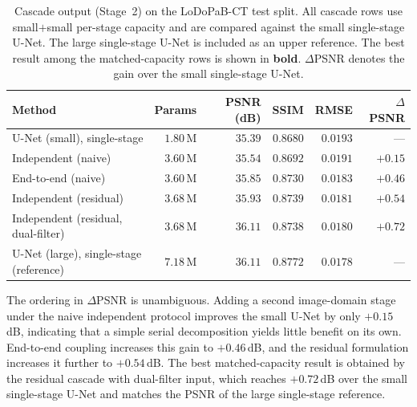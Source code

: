 \begin{table}[!htb]
    \centering
    \caption[Cascade comparison at matched per-stage capacity.]{%
        Cascade output (Stage~2) on the LoDoPaB-CT test split. All cascade
        rows use small$+$small per-stage capacity and are compared against
        the small single-stage U-Net. The large single-stage U-Net is
        included as an upper reference. The best result among the
        matched-capacity rows is shown in \textbf{bold}. $\Delta$PSNR denotes
        the gain over the small single-stage U-Net.}
    \label{tab:exp_cascade}
    \setlength{\tabcolsep}{6pt}
    \small
    \begin{tabular}{@{}l r r r r r@{}}
        \toprule
        Method                                     & Params      & PSNR (dB) & SSIM     & RMSE    & $\Delta$PSNR \\
        \midrule
        U-Net (small), single-stage                & $1.80$\,M   & $35.39$   & $0.8680$ & $0.0193$ & --- \\
        \quad Independent (naive)                  & $3.60$\,M   & $35.54$   & $0.8692$ & $0.0191$ & $+0.15$ \\
        \quad End-to-end (naive)                   & $3.60$\,M   & $35.85$   & $0.8730$ & $0.0183$ & $+0.46$ \\
        \quad Independent (residual)               & $3.68$\,M   & $35.93$   & $0.8739$ & $0.0181$ & $+0.54$ \\
        \quad Independent (residual, dual-filter)  & $3.68$\,M   & $\mathbf{36.11}$ & $\mathbf{0.8738}$ & $\mathbf{0.0180}$ & $\mathbf{+0.72}$ \\
        \midrule
        U-Net (large), single-stage (reference)    & $7.18$\,M   & $36.11$   & $0.8772$ & $0.0178$ & --- \\
        \bottomrule
    \end{tabular}
\end{table}

The ordering in $\Delta$PSNR is unambiguous. Adding a second image-domain stage under the naive independent protocol improves the small U-Net by only $+0.15$\,dB, indicating that a simple serial decomposition yields little benefit on its own. End-to-end coupling increases this gain to $+0.46$\,dB, and the residual formulation increases it further to $+0.54$\,dB. The best matched-capacity result is obtained by the residual cascade with dual-filter input, which reaches $+0.72$\,dB over the small single-stage U-Net and matches the PSNR of the large single-stage reference.

